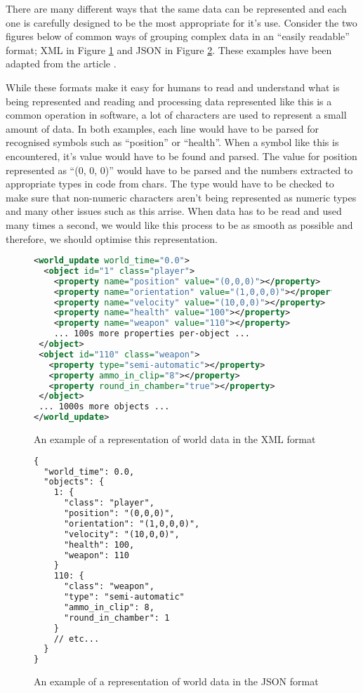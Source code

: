 There are many different ways that the same data can be represented and each one is carefully designed to be the most appropriate for it's use. Consider the two figures below of common ways of grouping complex data in an ``easily readable'' format; XML in Figure \ref{fig:xml-example} and JSON in Figure \ref{fig:json-example}. These examples have been adapted from the article .

While these formats make it easy for humans to read and understand what is being represented and reading and processing data represented like this is a common operation in software, a lot of characters are used to represent a small amount of data. In both examples, each line would have to be parsed for recognised symbols such as ``position'' or ``health''. When a symbol like this is encountered, it's value would have to be found and parsed. The value for position represented as ``(0, 0, 0)'' would have to be parsed and the numbers extracted to appropriate types in code from chars. The type would have to be checked to make sure that non-numeric characters aren't being represented as numeric types and many other issues such as this arrise. When data has to be read and used many times a second, we would like this process to be as smooth as possible and therefore, we should optimise this representation.

\newpage
\begin{figure}[!ht]
\begin{lstlisting}[language=xml]
<world_update world_time="0.0">
  <object id="1" class="player">
    <property name="position" value="(0,0,0)"></property>
    <property name="orientation" value="(1,0,0,0)"></property>
    <property name="velocity" value="(10,0,0)"></property>
    <property name="health" value="100"></property>
    <property name="weapon" value="110"></property>
    ... 100s more properties per-object ...
 </object>
 <object id="110" class="weapon">
   <property type="semi-automatic"></property>
   <property ammo_in_clip="8"></property>
   <property round_in_chamber="true"></property>
 </object>
 ... 1000s more objects ...
</world_update>
\end{lstlisting}

\caption{An example of a representation of world data in the XML format}
\label{fig:xml-example}
\end{figure}

\begin{figure}[!ht]
\begin{lstlisting}[language=xml]
{
  "world_time": 0.0,
  "objects": {
    1: {
      "class": "player",
      "position": "(0,0,0)",
      "orientation": "(1,0,0,0)",
      "velocity": "(10,0,0)",
      "health": 100,
      "weapon": 110
    }
    110: {
      "class": "weapon",
      "type": "semi-automatic"
      "ammo_in_clip": 8,
      "round_in_chamber": 1
    }
    // etc...
  }
}
\end{lstlisting}

\caption{An example of a representation of world data in the JSON format}
\label{fig:json-example}
\end{figure}
\newpage

